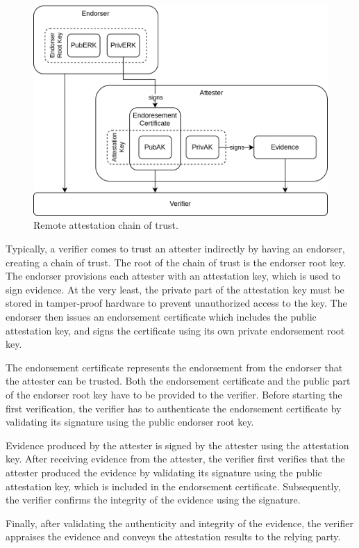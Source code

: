 \begin{figure}[H]
  \centering
  \includegraphics[width=0.75\linewidth]{resources/ra-chain-of-trust.drawio.png}
  \caption{Remote attestation chain of trust.}
  \label{fig:ra-chain-of-trust}
\end{figure}

Typically, a verifier comes to trust an attester indirectly by having an
endorser, creating a chain of trust. The root of the chain of trust is the
endorser root key. The endorser provisions each attester with an attestation
key, which is used to sign evidence. At the very least, the private part of the
attestation key must be stored in tamper-proof hardware to prevent unauthorized
access to the key. The endorser then issues an endorsement certificate which
includes the public attestation key, and signs the certificate using its own
private endorsement root key.

The endorsement certificate represents the endorsement from the endorser that
the attester can be trusted. Both the endorsement certificate and the public
part of the endorser root key have to be provided to the verifier. Before
starting the first verification, the verifier has to authenticate the
endorsement certificate by validating its signature using the public endorser
root key.

Evidence produced by the attester is signed by the attester using the
attestation key. After receiving evidence from the attester, the verifier first
verifies that the attester produced the evidence by validating its signature
using the public attestation key, which is included in the endorsement
certificate. Subsequently, the verifier confirms the integrity of the evidence
using the signature.

Finally, after validating the authenticity and integrity of the evidence, the
verifier appraises the evidence and conveys the attestation results to the
relying party.

